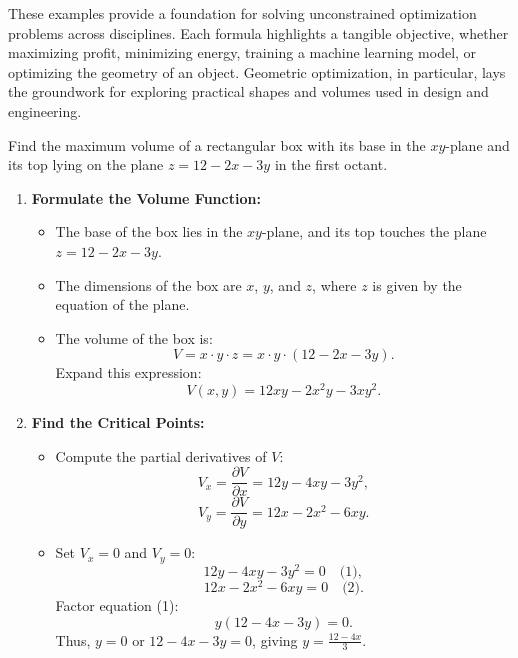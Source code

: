 \noindent These examples provide a foundation for solving unconstrained optimization problems across disciplines. Each formula highlights a tangible objective, whether maximizing profit, minimizing energy, training a machine learning model, or optimizing the geometry of an object. Geometric optimization, in particular, lays the groundwork for exploring practical shapes and volumes used in design and engineering.

\exampleline
\begin{example}
Find the maximum volume of a rectangular box with its base in the \(xy\)-plane and its top lying on the plane \( z = 12 - 2x - 3y \) in the first octant.

\begin{solution}
\begin{enumerate}
    \item \textbf{Formulate the Volume Function:}
    
    \begin{itemize}
        \item The base of the box lies in the \(xy\)-plane, and its top touches the plane \( z = 12 - 2x - 3y \).
        \item The dimensions of the box are \( x \), \( y \), and \( z \), where \( z \) is given by the equation of the plane.
        \item The volume of the box is:
        \[
        V = x \cdot y \cdot z = x \cdot y \cdot (12 - 2x - 3y).
        \]
        Expand this expression:
        \[
        V(x, y) = 12xy - 2x^2y - 3xy^2.
        \]
    \end{itemize}

    \item \textbf{Find the Critical Points:}
    
    \begin{itemize}
        \item Compute the partial derivatives of \( V \):
        \[
        V_x = \frac{\partial V}{\partial x} = 12y - 4xy - 3y^2,
        \]
        \[
        V_y = \frac{\partial V}{\partial y} = 12x - 2x^2 - 6xy.
        \]
        \item Set \( V_x = 0 \) and \( V_y = 0 \):
        \[
        12y - 4xy - 3y^2 = 0 \quad \text{(1)},
        \]
        \[
        12x - 2x^2 - 6xy = 0 \quad \text{(2)}.
        \]
        Factor equation (1):
        \[
        y(12 - 4x - 3y) = 0.
        \]
        Thus, \( y = 0 \) or \( 12 - 4x - 3y = 0 \), giving \( y = \frac{12 - 4x}{3} \).


\end{itemize}
\end{enumerate}
\end{solution}
\end{example}
